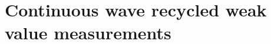 \chapter[Continuous wave recycling]{Continuous wave recycled weak value measurements}\label{ch:cw}

